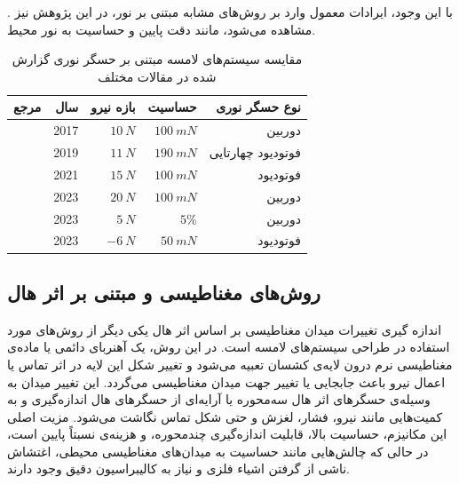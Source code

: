  \cite{costanzo2021optical}.
 با این وجود، ایرادات معمول وارد بر روش‌های مشابه مبتنی بر نور، در این پژوهش نیز مشاهده می‌شود، مانند دقت پایین و حساسیت به نور محیط.
 \begin{table}[t]
 	\centering
 	\caption{مقایسه سیستم‌های لامسه مبتنی بر حسگر نوری گزارش ‌شده در مقالات مختلف}
 	\label{tab:optical}
 	\onehalfspacing
 	\begin{tabular}{|r|r|r|r|r|}
 		\hline
 		\textbf{مرجع} & \textbf{سال}  & \textbf{بازه نیرو} & \textbf{حساسیت} & \textbf{نوع حسگر نوری} \\ \hline \hline
 		\cite{yuan2017gelsight} 
 		& 2017 
 		& $10 \: N$
 		& $100 \: mN$
 		&دوربین\\
 		\hline
 		
 		\cite{khamis_novel_2019} 
 		& 2019
 		& $11 \: N$
 		& $190 \: mN$
 		&فوتودیود چهارتایی\\
 		\hline
 		
 		\cite{costanzo2021optical} 
 		& 2021
 		& $15 \: N$
 		& $100 \: mN$
 		&فوتودیود \\
 		\hline
 		
 		\cite{do2022densetact} 
 		& 2023
 		& $20 \: N$
 		& $100 \: mN$
 		&دوربین\\
 		\hline
 		
 		\cite{kara2023towards} 
 		& 2023
 		& $5 \: N$
 		& $5 \%$
 		&دوربین\\
 		\hline
 		
 		\cite{leslie2023tactile} 
 		& 2023
 		& $-6 \: N$
 		& $50 \: mN$
 		&فوتودیود \\
 		\hline
 	\end{tabular}
 \end{table}

\subsection{روش‌های مغناطیسی و مبتنی بر اثر هال}\label{sec:mechanisms:mag}

اندازه گیری تغییرات میدان مغناطیسی بر اساس اثر هال
یکی دیگر از روش‌های مورد استفاده در طراحی سیستم‌های لامسه است. در این روش، یک آهنربای دائمی یا ماده‌ی مغناطیسی نرم درون لایه‌ی کشسان تعبیه می‌شود و تغییر شکل این لایه در اثر تماس یا اعمال نیرو باعث جابجایی یا تغییر جهت میدان مغناطیسی می‌گردد. این تغییر میدان به وسیله‌ی حسگرهای اثر هال سه‌محوره یا آرایه‌ای از حسگرهای هال اندازه‌گیری و به کمیت‌هایی مانند نیرو، فشار، لغزش و حتی شکل تماس نگاشت می‌شود. مزیت اصلی این مکانیزم، حساسیت بالا، قابلیت اندازه‌گیری چندمحوره، و هزینه‌ی نسبتاً پایین است، در حالی که چالش‌هایی مانند حساسیت به میدان‌های مغناطیسی محیطی، اغتشاش ناشی از گرفتن اشیاء فلزی و نیاز به کالیبراسیون دقیق وجود دارند.

